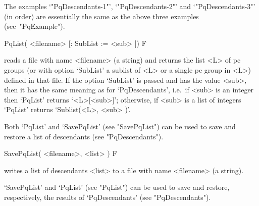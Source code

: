 The     examples     `"PqDescendants-1"',     `"PqDescendants-2"'     and
`"PqDescendants-3"' (in order) are essentially  the  same  as  the  above
three examples (see~"PqExample").

\>PqList( <filename> [: SubList := <sub> ]) F

reads a file with name <filename> (a string) and returns the list <L>  of
pc groups (or with option `SubList' a sublist of <L> or a single pc group
in <L>) defined in that file. If the option `SubList' is passed  and  has
the value <sub>, then it has the same  meaning  as  for  `PqDescendants',
i.e.~if  <sub>  is  an  integer  then  `PqList'   returns   `<L>[<sub>]';
otherwise, if <sub> is a list of integers `PqList' returns  `Sublist(<L>,
<sub> )'.

Both `PqList' and `SavePqList' (see "SavePqList") can be used to save and
restore a list of descendants (see "PqDescendants").

\>SavePqList( <filename>, <list> ) F

writes a list of descendants <list> to a file  with  name  <filename>  (a
string).

`SavePqList' and `PqList' (see "PqList") can be used to save and restore,
respectively, the results of `PqDescendants' (see "PqDescendants").

